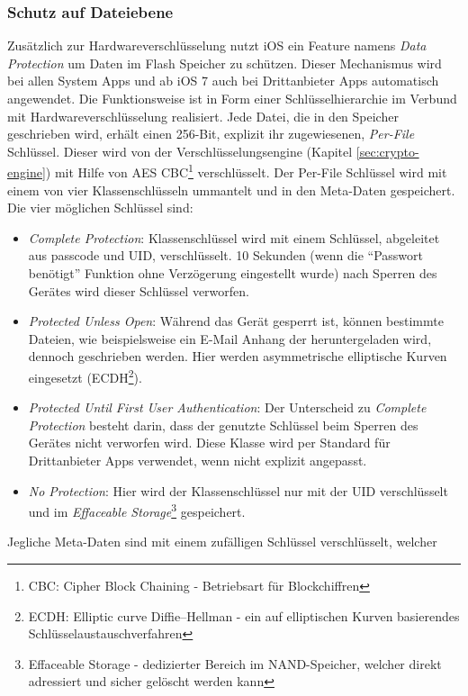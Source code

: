 	\subsubsection{Schutz auf Dateiebene}\label{sec:filesecurity}
		Zusätzlich zur Hardwareverschlüsselung nutzt iOS ein Feature namens
		\textsl{Data Protection} um Daten im Flash Speicher zu schützen. Dieser
		Mechanismus wird bei allen System Apps und ab iOS 7 auch bei Drittanbieter Apps
		automatisch angewendet. Die Funktionsweise ist in Form einer
		Schlüsselhierarchie im Verbund mit Hardwareverschlüsselung realisiert. Jede
		Datei, die in den Speicher geschrieben wird, erhält einen 256-Bit, explizit
		ihr zugewiesenen, \textsl{Per-File} Schlüssel. Dieser wird von der
		Verschlüsselungsengine (Kapitel \ref{sec:crypto-engine}) mit Hilfe von
		AES CBC\footnote{CBC: Cipher Block Chaining - Betriebsart für Blockchiffren}
		verschlüsselt. Der Per-File Schlüssel wird mit einem von vier
		Klassenschlüsseln ummantelt und in den Meta-Daten gespeichert. Die vier
		möglichen Schlüssel sind:
		\begin{itemize}
		  \item \textsl{Complete Protection}: Klassenschlüssel wird mit einem
		  Schlüssel, abgeleitet aus passcode und UID, verschlüsselt. 10 Sekunden (wenn
		  die "`Passwort benötigt"' Funktion ohne Verzögerung eingestellt wurde) nach
		  Sperren des Gerätes wird dieser Schlüssel verworfen.
		  \item \textsl{Protected Unless Open}: Während das Gerät gesperrt ist, können
		  bestimmte Dateien, wie beispielsweise ein E-Mail Anhang der heruntergeladen
		  wird, dennoch geschrieben werden. Hier werden asymmetrische elliptische
		  Kurven eingesetzt (ECDH\footnote{ECDH: Elliptic curve Diffie–Hellman -
		  ein auf elliptischen Kurven basierendes Schlüsselaustauschverfahren}).
		  \item \textsl{Protected Until First User Authentication}: Der Unterscheid zu
		  \textsl{Complete Protection} besteht darin, dass der genutzte Schlüssel
		  beim Sperren des Gerätes nicht verworfen wird. Diese Klasse wird per
		  Standard für Drittanbieter Apps verwendet, wenn nicht explizit angepasst.
		  \item \textsl{No Protection}: Hier wird der Klassenschlüssel nur mit der UID
		  verschlüsselt und im \textsl{Effaceable
		  Storage}\footnote{Effaceable Storage - dedizierter Bereich im NAND-Speicher,
		  welcher direkt adressiert und sicher gelöscht werden kann} gespeichert.
		\end{itemize}
		Jegliche Meta-Daten sind mit einem zufälligen Schlüssel verschlüsselt, welcher
